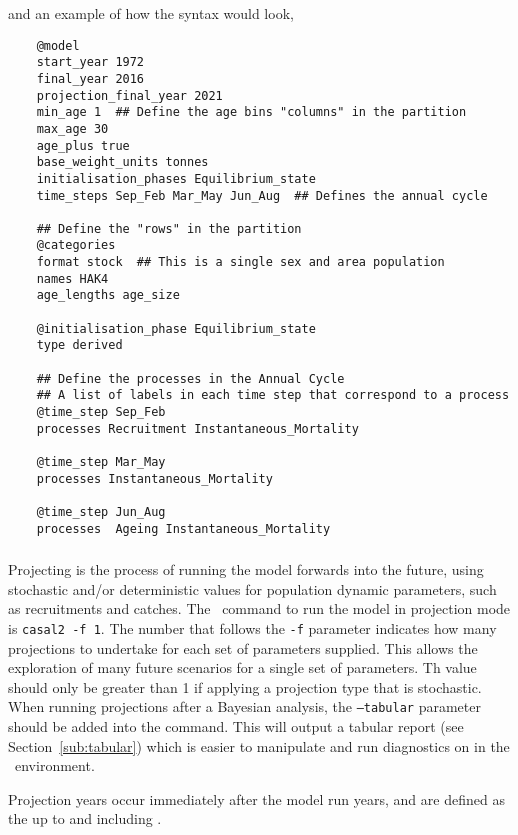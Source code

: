 and an example of how the syntax would look,

{\small{\begin{verbatim}	
	@model
	start_year 1972
	final_year 2016
	projection_final_year 2021
	min_age 1  ## Define the age bins "columns" in the partition
	max_age 30
	age_plus true
	base_weight_units tonnes
	initialisation_phases Equilibrium_state
	time_steps Sep_Feb Mar_May Jun_Aug  ## Defines the annual cycle

	## Define the "rows" in the partition
	@categories 
	format stock  ## This is a single sex and area population
	names HAK4 
	age_lengths age_size 
	
	@initialisation_phase Equilibrium_state
	type derived
	
	## Define the processes in the Annual Cycle
	## A list of labels in each time step that correspond to a process
	@time_step Sep_Feb 
	processes Recruitment Instantaneous_Mortality
	
	@time_step Mar_May 
	processes Instantaneous_Mortality 
	
	@time_step Jun_Aug 
	processes  Ageing Instantaneous_Mortality
\end{verbatim}}}
	

\subsubsection{}\label{sec:projection}

Projecting is the process of running the model forwards into the future, using stochastic and/or deterministic values for population dynamic parameters, such as recruitments and catches. The \CNAME\ command to run the model in projection mode is \texttt{casal2 -f 1}. The number that follows the \texttt{-f} parameter indicates how many projections to undertake for each set of parameters supplied. This allows the exploration of many future scenarios for a single set of parameters. Th value should only be greater than 1 if applying a projection type that is stochastic. When running projections after a Bayesian analysis, the \texttt{--tabular} parameter should be added into the command. This will output a tabular report (see Section~\ref{sub:tabular}) which is easier to manipulate and run diagnostics on in the \R\ environment.

Projection years occur immediately after the model run years, and are defined as the  up to and including .

